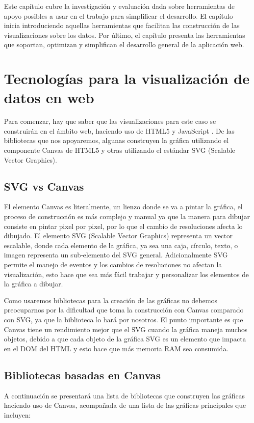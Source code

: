 Este capítulo cubre la investigación y evaluación dada sobre herramientas de apoyo posibles a usar en el trabajo para simplificar el desarrollo. El capítulo inicia introduciendo aquellas herramientas que facilitan las construcción de las visualizaciones sobre los datos. Por último, el capítulo presenta las herramientas que soportan, optimizan y simplifican el desarrollo general de la aplicación web.

\section{Tecnologías para la visualización de datos en web}
Para comenzar, hay que saber que las visualizaciones para este caso se construirán en el ámbito web, haciendo uso de HTML5 \cite{MozHTML} y JavaScript \cite{MozJS}. De las bibliotecas que nos apoyaremos, algunas construyen la gráfica utilizando el componente Canvas \cite{MozCanvas} de HTML5 y otras utilizando el estándar SVG \cite{W3SVG} (Scalable Vector Graphics).

\subsection[SVG vs Canvas]{SVG vs Canvas \cite{OperaSVGCanvas}}
El elemento Canvas es literalmente, un lienzo donde se va a pintar la gráfica, el proceso de construcción es más complejo y manual ya que la manera para dibujar consiste en pintar pixel por pixel, por lo que el cambio de resoluciones afecta lo dibujado. El elemento SVG (Scalable Vector Graphics) representa un vector escalable, donde cada elemento de la gráfica, ya sea una caja, círculo, texto, o imagen representa un sub-elemento del SVG general. Adicionalmente SVG permite el manejo de eventos y los cambios de resoluciones no afectan la visualización, esto hace que sea más fácil trabajar y personalizar los elementos de la gráfica a dibujar.

Como usaremos bibliotecas para la creación de las gráficas no debemos preocuparnos por la dificultad que toma la construcción con Canvas comparado con SVG, ya que la biblioteca lo hará por nosotros. El punto importante es que Canvas tiene un rendimiento mejor que el SVG cuando la gráfica maneja muchos objetos, debido a que cada objeto de la gráfica SVG es un elemento que impacta en el DOM \cite{W3DOM} del HTML y esto hace que más memoria RAM sea consumida.

\subsection{Bibliotecas basadas en Canvas}
A continuación se presentará una lista de bibliotecas que construyen las gráficas haciendo uso de Canvas, acompañada de una lista de las gráficas principales que incluyen:


